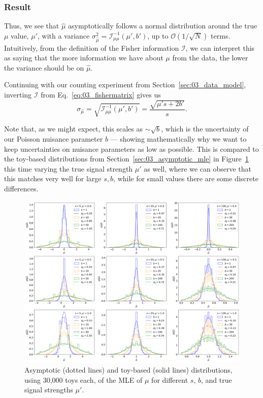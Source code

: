 \subsubsection{Result}
\label{sec:03_pmle_result}

Thus, we see that $\hat \mu$ asymptotically follows a normal distribution around the true $\mu$ value, $\mu'$, with a variance $\sigma_{\hat\mu}^2 = \mathcal I^{-1}_{\mu\mu}(\mu', b')$, up to $\mathcal O (1/\sqrt{N})$ terms.
Intuitively, from the definition of the Fisher information $\mathcal I$, we can interpret this as saying that the more information we have about $\mu$ from the data, the lower the variance should be on $\hat \mu$.

Continuing with our counting experiment from Section~\ref{sec:03_data_model}, inverting $\mathcal I$ from Eq.~\ref{eq:03_fishermatrix} gives us
\begin{equation}
    \sigma_{\hat\mu} = \sqrt{\mathcal I^{-1}_{\mu\mu}(\mu', b')} = \frac{\sqrt{\mu' s + 2b'}}{s}.
\label{eq:03_asymstd}
\end{equation}

Note that, as we might expect, this scales as $\sim \sqrt{b}$, which is the uncertainty of our Poisson nuisance parameter $b$ --- showing mathematically why we want to keep uncertainties on nuisance parameters as low as possible.
This is compared to the toy-based distributions from Section~\ref{sec:03_asymptotic_mle} in Figure~\ref{fig:03_p_mle_asym} this time varying the true signal strength $\mu'$ as well, where we can observe that this matches very well for large $s, b$, while for small values there are some discrete differences.

\begin{figure}[htb]
\centering
\includegraphics[width=\textwidth]{figures/03-Stats/05-asymptotic-mle/4.png}
\caption{Asymptotic (dotted lines) and toy-based (solid lines) distributions, using 30,000 toys each, of the MLE of $\mu$ for different $s$, $b$, and true signal strengths $\mu'$.}
\label{fig:03_p_mle_asym}
\end{figure}

